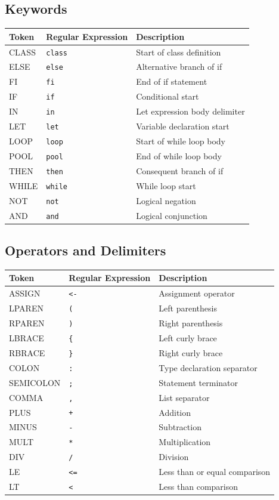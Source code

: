\documentclass[12pt,a4paper]{article}
\begin{document}
\subsection{Keywords}

\begin{tabularx}{\textwidth}{l l X}
\toprule
\textbf{Token} & \textbf{Regular Expression} & \textbf{Description} \\
\midrule
CLASS & \verb|class| & Start of class definition \\
ELSE & \verb|else| & Alternative branch of if \\
FI & \verb|fi| & End of if statement \\
IF & \verb|if| & Conditional start \\
IN & \verb|in| & Let expression body delimiter \\
LET & \verb|let| & Variable declaration start \\
LOOP & \verb|loop| & Start of while loop body \\
POOL & \verb|pool| & End of while loop body \\
THEN & \verb|then| & Consequent branch of if \\
WHILE & \verb|while| & While loop start \\
NOT & \verb|not| & Logical negation \\
AND & \verb|and| & Logical conjunction \\
\bottomrule
\end{tabularx}



\subsection{Operators and Delimiters}

\begin{tabularx}{\textwidth}{l l X}
\toprule
\textbf{Token} & \textbf{Regular Expression} & \textbf{Description} \\
\midrule
ASSIGN & \verb|<-| & Assignment operator \\
LPAREN & \verb|(| & Left parenthesis \\
RPAREN & \verb|)| & Right parenthesis \\
LBRACE & \texttt{\{} & Left curly brace \\
RBRACE & \texttt{\}} & Right curly brace \\
COLON & \verb|:| & Type declaration separator \\
SEMICOLON & \verb|;| & Statement terminator \\
COMMA & \verb|,| & List separator \\
PLUS & \verb|+| & Addition \\
MINUS & \verb|-| & Subtraction \\
MULT & \verb|*| & Multiplication \\
DIV & \verb|/| & Division \\
LE & \verb|<=| & Less than or equal comparison \\
LT & \verb|<| & Less than comparison \\
\bottomrule
\end{tabularx}
\end{document}
